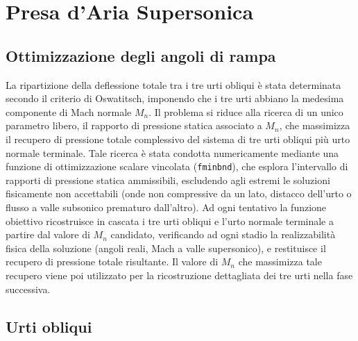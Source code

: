 \section{Presa d'Aria Supersonica}
\label{app:presa_ramjet}


\subsection{Ottimizzazione degli angoli di rampa}

La ripartizione della deflessione totale tra i tre urti obliqui è stata determinata secondo il criterio di Oswatitsch, imponendo che i tre urti abbiano la medesima componente di Mach normale $M_n$. Il problema si riduce alla ricerca di un unico parametro libero, il rapporto di pressione statica associato a $M_n$, che massimizza il recupero di pressione totale complessivo del sistema di tre urti obliqui più urto normale terminale. Tale ricerca è stata condotta numericamente mediante una funzione di ottimizzazione scalare vincolata (\texttt{fminbnd}), che esplora l'intervallo di rapporti di pressione statica ammissibili, escludendo agli estremi le soluzioni fisicamente non accettabili (onde non compressive da un lato, distacco dell'urto o flusso a valle subsonico prematuro dall'altro). Ad ogni tentativo la funzione obiettivo ricostruisce in cascata i tre urti obliqui e l'urto normale terminale a partire dal valore di $M_n$ candidato, verificando ad ogni stadio la realizzabilità fisica della soluzione (angoli reali, Mach a valle supersonico), e restituisce il recupero di pressione totale risultante. Il valore di $M_n$ che massimizza tale recupero viene poi utilizzato per la ricostruzione dettagliata dei tre urti nella fase successiva.

\subsection{Urti obliqui}


